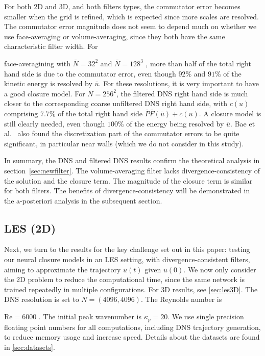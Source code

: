 \documentclass[preprint]{elsarticle}
\newcommand{\revtwo}[1]{#1}
\newcommand{\revboth}[1]{#1}
\begin{document}
For both 2D and 3D, and both filters types, the commutator error becomes smaller
when the grid is refined, which is expected since more scales are resolved. The
commutator error magnitude does not seem to depend much on whether we use
face-averaging or volume-averaging, since they both have the same characteristic
filter width. For
\revtwo{
    
    face-averagining with $\bar{N} = 32^2$ and $\bar{N} = 128^3$
}, more than half of the
total right hand side is due to the commutator error, even though 
\revtwo{ $92\%$ and $91\%$}
of the kinetic energy is resolved by $\bar{u}$. For these resolutions, it
is very important to have a good closure model. For $\bar{N} = 256^2$, the
filtered DNS right hand side is much closer to the corresponding coarse
unfiltered DNS right hand side, with $c(u)$ comprising
\revtwo{ $7.7\%$}
of the total right hand side $\bar{P} \bar{F}(\bar{u}) + c(u)$.
A closure model is still clearly needed, even though
\revtwo{ $100\%$}
of the energy being resolved by $\bar{u}$.
Bae et al.~\cite{Bae2022} also found the discretization part of the commutator
errors to be quite significant, in particular near walls (which we do not
consider in this study).

In summary, the DNS and filtered DNS results confirm the theoretical analysis in
section~\ref{sec:newfilter}.
The volume-averaging filter lacks
divergence-consistency of the solution and the closure term. The magnitude of
the closure term is similar for both filters. The benefits of
divergence-consistency will be demonstrated in the a-posteriori analysis in the
subsequent section.

\subsection{LES (2D)} \label{sec:analysis_les}

Next, we turn to the results for the key challenge set out in this paper:
testing our neural closure models in an LES setting, with divergence-consistent
filters, aiming to approximate the trajectory $\bar{u}(t)$ given $\bar{u}(0)$.
We now only consider the 2D problem to reduce the computational time, since
the same network is trained repeatedly in multiple configurations. For 3D
results, see \ref{sec:les3D}.  The DNS resolution is set to $N = (4096, 4096)$.
The Reynolds number is
\revboth{
    
    $\mathrm{Re} = 6000$
}. The initial peak wavenumber is $\kappa_p = 20$. We use
single precision floating point numbers for all computations, including DNS
trajectory generation, to reduce memory usage and increase speed.
Details about the datasets are found in \ref{sec:datasets}.
\end{document}
